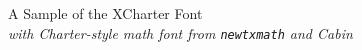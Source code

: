 \documentclass[11pt]{article}
\begin{document}
{\LARGE \noindent A Sample of the XCharter Font}\\

{\large \noindent \textit{with Charter-style math font from \texttt{newtxmath} and Cabin}}\\[5pt]


\end{document}
